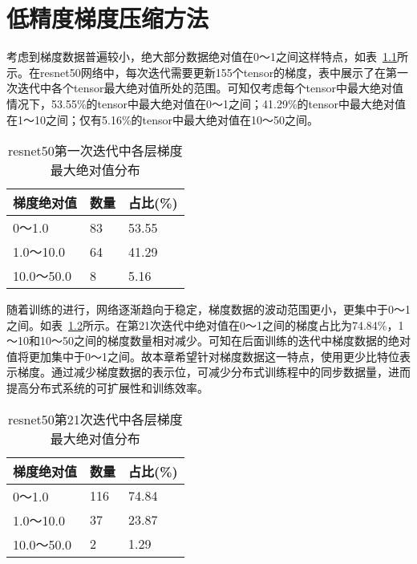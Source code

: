 \chapter{低精度梯度压缩方法}
考虑到梯度数据普遍较小，绝大部分数据绝对值在0～1之间这样特点，如表~\ref{tab:resnet50_1iter_grad_fabs}所示。在resnet50网络中，每次迭代需要更新155个tensor的梯度，表中展示了在第一次迭代中各个tensor最大绝对值所处的范围。可知仅考虑每个tensor中最大绝对值情况下，53.55\%的tensor中最大绝对值在0～1之间；41.29\%的tensor中最大绝对值在1～10之间；仅有5.16\%的tensor中最大绝对值在10～50之间。
\begin{table}[htb]
\centering
\noindent\begin{minipage}{0.65\textwidth}
\centering
\caption{resnet50第一次迭代中各层梯度最大绝对值分布}
\label{tab:resnet50_1iter_grad_fabs}
\begin{tabular}{p{2.5cm}p{2.5cm}p{2.5cm}}
\toprule[1.5pt]
梯度绝对值 & 数量 & 占比(\%) \\\midrule[1pt]
0～1.0 & 83 & 53.55\\
1.0～10.0 & 64 & 41.29\\
10.0～50.0 & 8 & 5.16\\
\midrule[1pt]
\end{tabular}
\end{minipage}
\end{table}

随着训练的进行，网络逐渐趋向于稳定，梯度数据的波动范围更小，更集中于0～1之间。如表~\ref{tab:resnet50_21iter_grad_fabs}所示。在第21次迭代中绝对值在0～1之间的梯度占比为74.84\%，1～10和10～50之间的梯度数量相对减少。可知在后面训练的迭代中梯度数据的绝对值将更加集中于0～1之间。故本章希望针对梯度数据这一特点，使用更少比特位表示梯度。通过减少梯度数据的表示位，可减少分布式训练程中的同步数据量，进而提高分布式系统的可扩展性和训练效率。
\begin{table}[htb]
\centering
\noindent\begin{minipage}{0.65\textwidth}
\centering
\caption{resnet50第21次迭代中各层梯度最大绝对值分布}
\label{tab:resnet50_21iter_grad_fabs}
\begin{tabular}{p{2.5cm}p{2.5cm}p{2.5cm}}
\toprule[1.5pt]
梯度绝对值 & 数量 & 占比(\%) \\\midrule[1pt]
0～1.0 & 116 & 74.84\\
1.0～10.0 & 37 & 23.87\\
10.0～50.0 & 2 & 1.29\\
\midrule[1pt]
\end{tabular}
\end{minipage}
\end{table}

